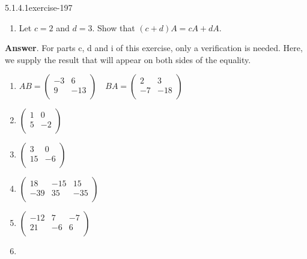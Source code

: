 \documentclass[twoside,10pt,]{book}
\numberwithin{equation}{section}
\begin{document}
\begin{divisionsolution}{5.1.4.1}{}{exercise-197}
\begin{enumerate}[label=(\alph*)]
Compute \(0A\), where 0 is the real number (scalar) zero.%
\item\hypertarget{li-916}{}\hypertarget{p-1745}{}%
Let \(c = 2\) and \(d = 3\). Show that \((c + d)A = c A + d A\).%
\end{enumerate}
%
\par\smallskip%
\noindent\textbf{Answer}.\quad%
\hypertarget{p-1746}{}%
For parts c, d and i of this exercise, only a verification is needed. Here, we supply the result that will appear on both sides of the equality.%
\par
\hypertarget{p-1747}{}%
\leavevmode%
\begin{enumerate}[label=(\alph*)]
\item\hypertarget{li-917}{}\hypertarget{p-1748}{}%
\(AB=\left(
\begin{array}{cc}
-3 &6 \\
9 & -13 \\
\end{array}
\right) \quad BA=\left(
\begin{array}{cc}
2 & 3 \\
-7 & -18 \\
\end{array}
\right)\)%
\item\hypertarget{li-918}{}\hypertarget{p-1749}{}%
\(\left(
\begin{array}{cc}
1 & 0 \\
5 & -2 \\
\end{array}
\right)\)%
\item\hypertarget{li-919}{}\hypertarget{p-1750}{}%
\(\left(
\begin{array}{cc}
3 & 0 \\
15 & -6 \\
\end{array}
\right)\)%
\item\hypertarget{li-920}{}\hypertarget{p-1751}{}%
\(\left(
\begin{array}{ccc}
18 & -15 & 15 \\
-39 & 35 & -35 \\
\end{array}
\right)\)%
\item\hypertarget{li-921}{}\hypertarget{p-1752}{}%
\(\left(
\begin{array}{ccc}
-12 & 7 & -7 \\
21 & -6 & 6 \\
\end{array}
\right)\)%
\item\hypertarget{li-922}{}\hypertarget{p-1753}{}%

\end{enumerate}
\end{divisionsolution}
\end{document}
